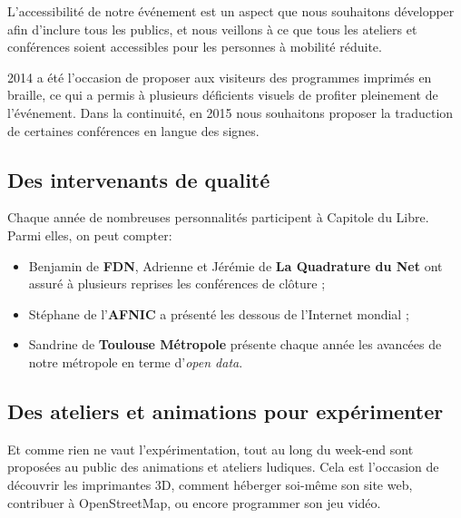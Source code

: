 \begin{minipage}{0.3\textwidth}
\begin{center}
\end{center}
\end{minipage}
\begin{minipage}{0.7\textwidth}
L'accessibilité de notre événement est un aspect que nous souhaitons
 développer afin d'inclure tous les publics, et nous veillons à ce que
 tous les ateliers et conférences soient accessibles pour les personnes
 à mobilité réduite.

2014 a été l'occasion de proposer aux visiteurs des programmes
 imprimés en braille, ce qui a permis à plusieurs déficients visuels
 de profiter pleinement de l'événement. Dans la continuité, en 2015
 nous souhaitons proposer la traduction de certaines conférences en
 langue des signes.
\end{minipage}

\subsection{Des intervenants de qualité}

Chaque année de nombreuses personnalités participent à Capitole du Libre. Parmi elles, on peut compter:

\begin{itemize}[label=$\bullet$]
\item Benjamin  de \textbf{FDN}, Adrienne  et Jérémie  de \textbf{La Quadrature du Net} ont assuré à plusieurs reprises les conférences de clôture ;
\item Stéphane  de l'\textbf{AFNIC} a présenté les dessous de l'Internet mondial ;
\item Sandrine  de \textbf{Toulouse Métropole} présente chaque année les avancées de notre métropole en terme d'\textit{open data}.
\end{itemize} 

\subsection{Des ateliers et animations pour expérimenter}

\begin{minipage}{0.7\textwidth}
Et comme rien ne vaut l'expérimentation, tout au long du week-end sont 
proposées au public des animations et ateliers ludiques. Cela est 
l'occasion de découvrir les imprimantes 3D, comment héberger soi-même son 
site web, contribuer à OpenStreetMap, ou encore programmer son jeu vidéo.
\end{minipage}
\begin{minipage}{0.3\textwidth}
\end{minipage}

